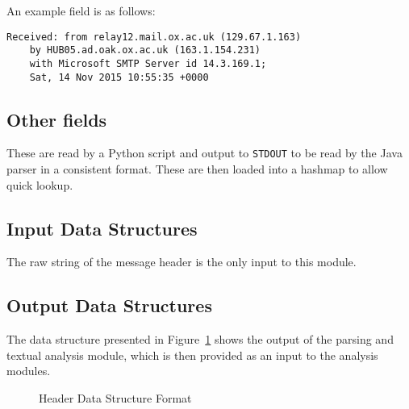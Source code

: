 An example field is as follows:
\begin{verbatim}
Received: from relay12.mail.ox.ac.uk (129.67.1.163)
    by HUB05.ad.oak.ox.ac.uk (163.1.154.231)
    with Microsoft SMTP Server id 14.3.169.1;
    Sat, 14 Nov 2015 10:55:35 +0000
\end{verbatim}
\subsection{Other fields}

These are read by a Python script and output to \texttt{STDOUT} to be read by
the Java parser in a consistent format.  These are then loaded into a hashmap to
allow quick lookup.


\subsection{Input Data Structures}
The raw string of the message header is the only input to this module.

\subsection{Output Data Structures}
The data structure presented in Figure~\ref{fig:hea} shows the output of the
parsing and textual analysis module, which is then provided as an input to the
analysis modules.

\begin{figure}[!ht]
\centering
{}
	\caption{Header Data Structure Format}
	\label{fig:hea}
\end{figure}


